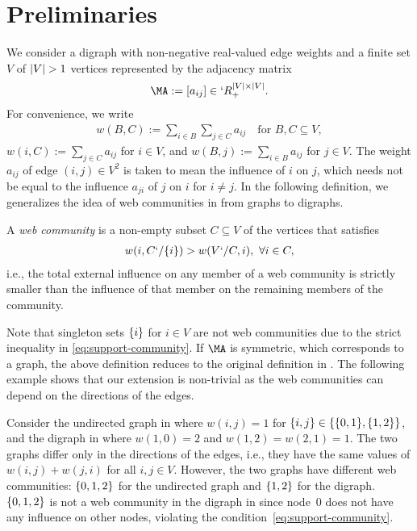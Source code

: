\section{Preliminaries}
\label{sec:preliminaries}

We consider a digraph with non-negative real-valued edge weights and a finite set $V$ of $\lvert V\rvert>1$ vertices represented by the adjacency matrix
\begin{align*}
\MA := [a_{ij}]\in `R_+^{\abs{V}\times \abs{V}}.
\end{align*}
For convenience, we write
\begin{align*}
  w(B,C) := \sum_{i\in B}\sum_{j\in C} a_{ij} \quad \text{for }B,C\subseteq V,
\end{align*}
$w(i,C):=\sum_{j\in C}a_{ij}$ for $i\in V$, and $w(B,j):=\sum_{i\in B}a_{ij}$ for $j\in
V$. The weight $a_{ij}$ of edge $(i,j)\in V^2$ is taken to mean the influence of $i$ on $j$, which
needs not be equal to the influence $a_{ji}$ of $j$ on $i$ for $i\neq j$. In the following
definition, we generalizes the idea of web communities in \cite{flake:efficient,
flake:cut-clustering} from graphs to digraphs.
\begin{definition}
  \label{def:support-community}
  A \emph{web community} is a non-empty subset $C\subseteq V$ of the vertices that satisfies
  \begin{align}
    \label{eq:support-community}
    w(i,C`/\{i\}) > w(V`/ C,i), \ \forall i \in C,
  \end{align}
  i.e., the total external influence on any member of a web community is strictly smaller than the
  influence of that member on the remaining members of the community. 
\end{definition}
Note that singleton sets $\{i\}$ for $i\in V$ are not web communities due to the strict inequality in \eqref{eq:support-community}. If $\MA$ is symmetric, which corresponds to a graph, the above definition reduces
to the original definition in \cite{flake:cut-clustering}. The following example shows that our extension is non-trivial as the web communities can depend on the directions of the edges.

\begin{example}
  \label{eg:directed-undirected}
  Consider the undirected graph in  where $w(i,j)=1$ for $\{i,j\}\in \{\{0,1\},\{1,2\}\}$, and the digraph in  where $w(1,0)=2$ and $w(1,2)=w(2,1)=1$. The two graphs differ only in the directions of the edges, i.e., they have the same values of $w(i,j)+w(j,i)$ for all $i,j\in V$. However, the two graphs have different web communities: $\{0,1,2\}$ for the undirected graph and $\{1,2\}$ for the digraph. $\{0,1,2\}$ is not a web community in the digraph in  since node~$0$ does not have any influence on other nodes, violating the condition~\eqref{eq:support-community}.
\end{example}

